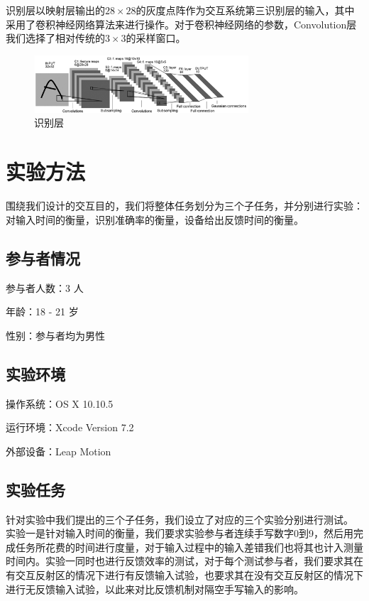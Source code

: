 \documentclass[10pt, twocolumn]{article}
\begin{document}
	识别层以映射层输出的$28 \times 28$的灰度点阵作为交互系统第三识别层的输入，其中采用了卷积神经网络算法来进行操作。对于卷积神经网络的参数，Convolution层我们选择了相对传统的$3 \times 3$的采样窗口。


\begin{figure}[htb]
\centering
\begin{minipage}[t]{1\linewidth}
\centering
\includegraphics[width=8cm]{cnn.png}
\caption{识别层}
\label{fig: output_layer}
\end{minipage}
\end{figure}



\section{实验方法}
	
	围绕我们设计的交互目的，我们将整体任务划分为三个子任务，并分别进行实验：对输入时间的衡量，识别准确率的衡量，设备给出反馈时间的衡量。
	
	\subsection{参与者情况}

	参与者人数：3 人

	年龄：18 - 21 岁

	性别：参与者均为男性
	
	\subsection{实验环境}

	操作系统：OS X 10.10.5

	运行环境：Xcode Version 7.2

	外部设备：Leap Motion

	\subsection{实验任务}
	
	针对实验中我们提出的三个子任务，我们设立了对应的三个实验分别进行测试。
	实验一是针对输入时间的衡量，我们要求实验参与者连续手写数字0到9，然后用完成任务所花费的时间进行度量，对于输入过程中的输入差错我们也将其也计入测量时间内。实验一同时也进行反馈效率的测试，对于每个测试参与者，我们要求其在有交互反射区的情况下进行有反馈输入试验，也要求其在没有交互反射区的情况下进行无反馈输入试验，以此来对比反馈机制对隔空手写输入的影响。
	
\end{document}
